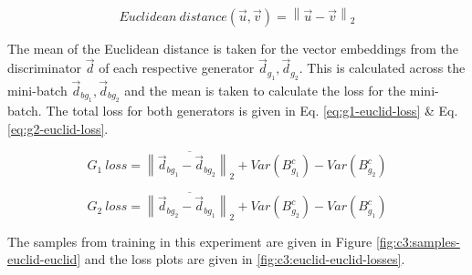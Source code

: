 \begin{equation} 
    Euclidean\ distance(\vec u, \vec v) = \left \lVert \vec u - \vec v \right \rVert_2
    \label{eq:euclid-dist}
\end{equation}

The mean of the Euclidean distance is taken for the vector embeddings from the discriminator $\vec d$ of each respective generator $\vec d_{g_{1}}, \vec d_{g_{2}}$. 
This is calculated across the mini-batch $\vec d_{bg_{1}}, \vec d_{bg_{2}}$ and the mean is taken to calculate the loss for the mini-batch. 
The total loss for both generators is given in Eq. \ref{eq:g1-euclid-loss} \& Eq. \ref{eq:g2-euclid-loss}.

\begin{equation} 
    G_{1}\ loss = \overline{\left \lVert \vec d_{bg_{1}} - \vec d_{bg_{2}} \right \rVert_2} + Var(B_{g_{1}}^{c}) - Var(B_{g_{2}}^{c})
    \label{eq:g1-euclid-loss}
\end{equation}

\begin{equation} 
    G_{2}\ loss = \overline{\left \lVert \vec d_{bg_{2}} - \vec d_{bg_{1}} \right \rVert_2} + Var(B_{g_{2}}^{c}) - Var(B_{g_{1}}^{c})
    \label{eq:g2-euclid-loss}
\end{equation}

The samples from training in this experiment are given in Figure \ref{fig:c3:samples-euclid-euclid} and the loss plots are given in \ref{fig:c3:euclid-euclid-losses}.

